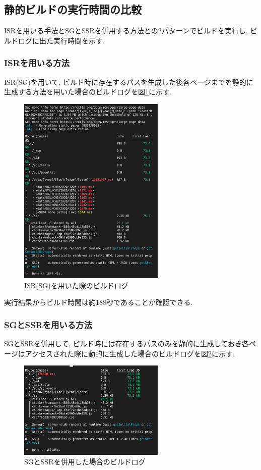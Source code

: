 \subsection{静的ビルドの実行時間の比較}
ISRを用いる手法とSGとSSRを併用する方法との2パターンでビルドを実行し, ビルドログに出た実行時間を示す.
\subsubsection{ISRを用いる方法}
ISR(SG)を用いて, ビルド時に存在するパスを生成した後各ページまでを静的に生成する方法を用いた場合のビルドログを図\ref{fig:ISR-build}に示す.

\begin{figure}[htbp]
	\begin{center}
		\includegraphics[width=70mm]{./images/ISR-log.png}
		\caption{ISR(SG)を用いた際のビルドログ}\label{fig:ISR-build}
	\end{center}
\end{figure}

実行結果からビルド時間は約188秒であることが確認できる.

\subsubsection{SGとSSRを用いる方法}
SGとSSRを併用して, ビルド時には存在するパスのみを静的に生成しておき各ページはアクセスされた際に動的に生成した場合のビルドログを図\ref{fig:SG-SSR-build}に示す.

\begin{figure}[htbp]
	\begin{center}
		\includegraphics[width=70mm]{./images/SGandSSR-log.png}
		\caption{SGとSSRを併用した場合のビルドログ}\label{fig:SG-SSR-build}
	\end{center}
\end{figure}


